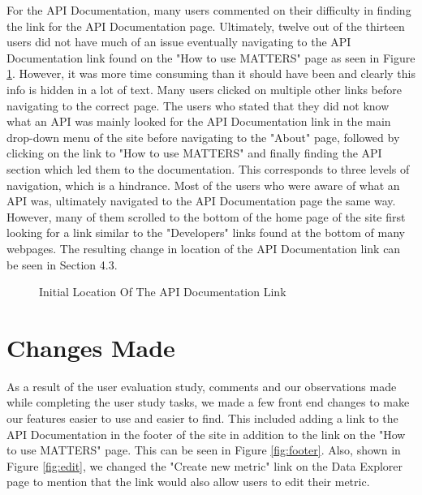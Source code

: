 		For the API Documentation, many users commented on their difficulty in finding 
		the link for the API Documentation page. Ultimately, twelve out of the thirteen 
		users did not have much of an issue eventually navigating to the API Documentation 
		link found on the "How to use MATTERS" page as seen in Figure \ref{fig:how}. However, it was more 
		time consuming than it should have been and clearly this info is hidden in a lot of text. Many users clicked on multiple other 
		links before navigating to the correct page. The users who stated that they did not 
		know what an API was mainly looked for the API Documentation link in the main drop-down 
		menu of the site before navigating to the "About" page, followed by clicking on the 
		link to "How to use MATTERS" and finally finding the API section which led them to 
		the documentation. This corresponds to three levels of navigation, which is a hindrance. Most of the users who were aware of what an API was, ultimately 
		navigated to the API Documentation page the same way. However, many of them scrolled 
		to the bottom of the home page of the site first looking for a link similar to the "Developers" 
		links found at the bottom of many webpages. The resulting change in location of the API Documentation link can be seen in Section 4.3.
		
			\begin{figure}[t]
				\centering
				\caption{Initial Location Of The API Documentation Link}
				\label{fig:how}
			\end{figure}
		
	\section{Changes Made}

		As a result of the user evaluation study, comments and our observations made while completing 
		the user study tasks, we made a few front end changes to make our features easier 
		to use and easier to find. This included adding a link to the API Documentation in 
		the footer of the site in addition to the link on the "How to use MATTERS" page. This can be seen 
		in Figure \ref{fig:footer}.  Also, shown in Figure \ref{fig:edit}, we changed the "Create new metric" link on the 
		Data Explorer page to mention that the link would also allow users to edit their metric. 
		
